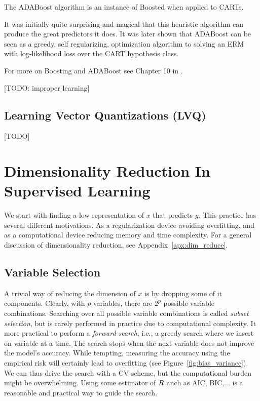 The ADABoost algorithm \citep{freund_decision-theoretic_1997} is an instance of Boosted when applied to CARTs.

It was initially quite surprising and magical that this heuristic algorithm can produce the great predictors it does. 
It was later shown that ADABoost can be seen as a greedy, self regularizing, optimization algorithm to solving an ERM with log-likelihood loss \citep{friedman_additive_2000} over the CART hypothesis class.

For more on Boosting and ADABoost see Chapter 10 in \cite{hastie_elements_2003}.

[TODO: improper learning]

\subsection{Learning Vector Quantizations (LVQ)}
[TODO]






\section{Dimensionality Reduction In Supervised Learning}
\label{sec:dim_reduce_supervised}
We start with finding a low representation of $x$ that predicts $y$.
This practice has several different motivations. As a regularization device avoiding overfitting, and  as a computational device reducing memory and time complexity. 
For a general discussion of dimensionality reduction, see Appendix~\ref{apx:dim_reduce}.



\subsection{Variable Selection}
A trivial way of reducing the dimension of $x$ is by dropping some of it components. 
Clearly, with $p$ variables, there are $2^p$ possible variable combinations. Searching over all possible variable combinations is called \emph{subset selection}, but is rarely performed in practice due to computational complexity. It more practical to perform a \emph{forward search}, i.e., a greedy search where we insert on variable at a time.
The search stops when the next variable does not improve the model's accuracy. 
While tempting, measuring the accuracy using the empirical risk will certainly lead to overfitting (see Figure~\ref{fig:bias_variance}).
We can thus drive the search with a CV scheme, but the computational burden might be overwhelming. Using some estimator of $R$ auch as AIC, BIC,... is a reasonable and practical way to guide the search.


